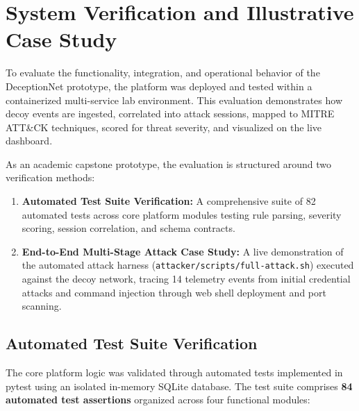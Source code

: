 \documentclass[12pt,a4paper]{report}
\begin{document}


\section{System Verification and Illustrative Case Study}

To evaluate the functionality, integration, and operational behavior of the DeceptionNet prototype, the platform was deployed and tested within a containerized multi-service lab environment. This evaluation demonstrates how decoy events are ingested, correlated into attack sessions, mapped to MITRE ATT\&CK techniques, scored for threat severity, and visualized on the live dashboard.

As an academic capstone prototype, the evaluation is structured around two verification methods:
\begin{enumerate}
\item \textbf{Automated Test Suite Verification:} A comprehensive suite of 82 automated tests across core platform modules testing rule parsing, severity scoring, session correlation, and schema contracts.
\item \textbf{End-to-End Multi-Stage Attack Case Study:} A live demonstration of the automated attack harness (\texttt{attacker/scripts/full-attack.sh}) executed against the decoy network, tracing 14 telemetry events from initial credential attacks and command injection through web shell deployment and port scanning.
\end{enumerate}

\subsection{Automated Test Suite Verification}

The core platform logic was validated through automated tests implemented in pytest using an isolated in-memory SQLite database. The test suite comprises \textbf{84 automated test assertions} organized across four functional modules:
\end{document}
